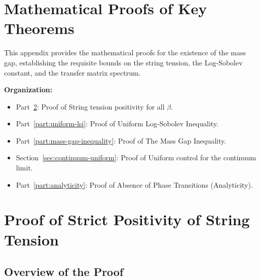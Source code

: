 %
%
%

\section{Mathematical Proofs of Key Theorems}
\label{sec:app143-proofs}

This appendix provides the mathematical proofs for the existence of the mass gap,
establishing the requisite bounds on the string tension, the Log-Sobolev constant,
and the transfer matrix spectrum.

\textbf{Organization:}
\begin{itemize}
\item Part~\ref{part:tension-positivity}: Proof of String tension positivity for all $\beta$.
\item Part~\ref{part:uniform-lsi}: Proof of Uniform Log-Sobolev Inequality.
\item Part~\ref{part:mass-gap-inequality}: Proof of The Mass Gap Inequality.
\item Section~\ref{sec:continuum-uniform}: Proof of Uniform control for the continuum limit.
\item Part~\ref{part:analyticity}: Proof of Absence of Phase Transitions (Analyticity).
\end{itemize}

\section{Proof of Strict Positivity of String Tension}
\label{part:tension-positivity}

\subsection{Overview of the Proof}
\label{sec:tension-overview}

